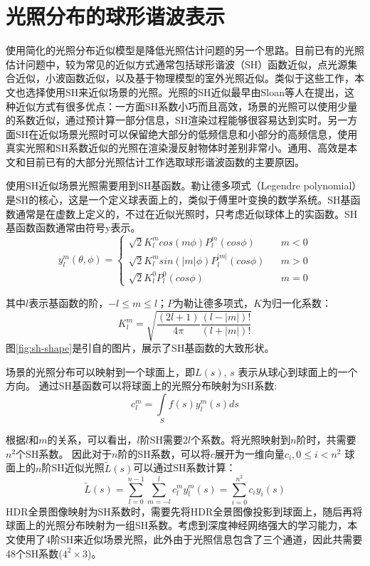 \section{光照分布的球形谐波表示}
使用简化的光照分布近似模型是降低光照估计问题的另一个思路。目前已有的光照估计问题中，较为常见的近似方式通常包括球形谐波（SH）函数近似，点光源集合近似，小波函数近似，以及基于物理模型的室外光照近似。类似于这些工作，本文也选择使用SH来近似场景的光照。光照的SH近似最早由Sloan等人在\cite{sloan2002precomputed}提出，这种近似方式有很多优点：一方面SH系数小巧而且高效，场景的光照可以使用少量的系数近似，通过预计算一部分信息，SH渲染过程能够很容易达到实时。另一方面SH在近似场景光照时可以保留绝大部分的低频信息和小部分的高频信息，使用真实光照和SH系数近似的光照在渲染漫反射物体时差别非常小。通用、高效是本文和目前已有的大部分光照估计工作选取球形谐波函数的主要原因。

使用SH近似场景光照需要用到SH基函数。勒让德多项式（Legendre polynomial）是SH的核心，这是一个定义球表面上的，类似于傅里叶变换的数学系统。SH基函数通常是在虚数上定义的，不过在近似光照时，只考虑近似球体上的实函数。SH基函数函数通常由符号y表示。
\begin{equation}
y^m_l(\theta, \phi)=\left\{
    \begin{array}{lcl}
        \sqrt{2}K^m_lcos(m\phi)P^m_l(cos\phi) & & {m<0}\\
        \sqrt{2}K^m_lsin(|m|\phi)P^|m|_l(cos\phi) & & {m>0}\\
        \sqrt{2}K^0_lP^0_l(cos\phi) & & {m=0}
    \end{array} \right. 
\end{equation}

其中$l$表示基函数的阶，$-l \leq m \leq l$；$P$为勒让德多项式，$K$为归一化系数：
\begin{equation}
    K^m_l=\sqrt{\frac{(2l+1)}{4\pi}\frac{(l-|m|)!}{(l+|m|)!}}
\end{equation}
图\ref{fig:sh-shape}是引自\cite{green2003spherical}的图片，展示了SH基函数的大致形状。

场景的光照分布可以映射到一个球面上，即$L(s)$, $s$ 表示从球心到球面上的一个方向。
通过SH基函数可以将球面上的光照分布映射为SH系数:
\begin{equation}
    c^m_l = \int\limits_{S}f(s)y^m_l(s)ds
\end{equation}

根据$l$和$m$的关系，可以看出，$l$阶SH需要$2l$个系数。将光照映射到$n$阶时，共需要$n^2$个SH系数。
因此对于$n$阶的SH系数，可以将$c$展开为一维向量$c_i, 0 \leq i < n^2$
球面上的$n$阶SH近似光照$\tilde{L}(s)$可以通过SH系数计算：
\begin{equation}
    \tilde{L}(s)=\sum_{l=0}^{n-1}\sum_{m=-l}^{l}c^m_ly^m_l(s)=\sum_{i=0}^{n^2}c_iy_i(s)
\end{equation}
HDR全景图像映射为SH系数时，需要先将HDR全景图像投影到球面上，随后再将球面上的光照分布映射为一组SH系数。考虑到深度神经网络强大的学习能力，本文使用了4阶SH来近似场景光照，此外由于光照信息包含了三个通道，因此共需要48个SH系数($4^2\times3$)。
